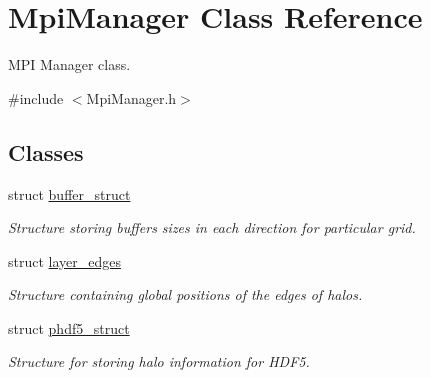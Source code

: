 \hypertarget{class_mpi_manager}{}\section{Mpi\+Manager Class Reference}
\label{class_mpi_manager}


M\+PI Manager class.  




{\ttfamily \#include $<$Mpi\+Manager.\+h$>$}

\subsection*{Classes}
\begin{DoxyCompactItemize}
\item 
struct \hyperlink{struct_mpi_manager_1_1buffer__struct}{buffer\+\_\+struct}
\begin{DoxyCompactList}\small\item\em Structure storing buffers sizes in each direction for particular grid. \end{DoxyCompactList}\item 
struct \hyperlink{struct_mpi_manager_1_1layer__edges}{layer\+\_\+edges}
\begin{DoxyCompactList}\small\item\em Structure containing global positions of the edges of halos. \end{DoxyCompactList}\item 
struct \hyperlink{struct_mpi_manager_1_1phdf5__struct}{phdf5\+\_\+struct}
\begin{DoxyCompactList}\small\item\em Structure for storing halo information for H\+D\+F5. \end{DoxyCompactList}\end{DoxyCompactItemize}
